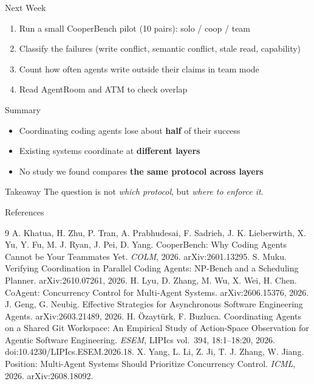 \documentclass[aspectratio=169,11pt]{beamer}
\begin{document}
\begin{frame}{Next Week}
  \begin{enumerate}
    \item Run a small CooperBench pilot (10 pairs): solo / coop / team
    \item Classify the failures (write conflict, semantic conflict, stale read, capability)
    \item Count how often agents write outside their claims in team mode
    \item Read AgentRoom and ATM to check overlap
  \end{enumerate}
\end{frame}

\begin{frame}{Summary}
  \begin{itemize}
    \item Coordinating coding agents lose about \textbf{half} of their success
    \item Existing systems coordinate at \textbf{different layers}
    \item No study we found compares \textbf{the same protocol across layers}
  \end{itemize}
  \vspace{1em}
  \begin{block}{Takeaway}
    The question is not \emph{which protocol}, but \emph{where to enforce it}.
  \end{block}
\end{frame}

\begin{frame}[allowframebreaks]{References}
  \footnotesize
  \begin{thebibliography}{9}
     A. Khatua, H. Zhu, P. Tran, A. Prabhudesai, F. Sadrieh, J. K. Lieberwirth, X. Yu, Y. Fu, M. J. Ryan, J. Pei, D. Yang. CooperBench: Why Coding Agents Cannot be Your Teammates Yet. \textit{COLM}, 2026. arXiv:2601.13295.
     S. Muku. Verifying Coordination in Parallel Coding Agents: NP-Bench and a Scheduling Planner. arXiv:2610.07261, 2026.
     H. Lyu, D. Zhang, M. Wu, X. Wei, H. Chen. CoAgent: Concurrency Control for Multi-Agent Systems. arXiv:2606.15376, 2026.
     J. Geng, G. Neubig. Effective Strategies for Asynchronous Software Engineering Agents. arXiv:2603.21489, 2026.
     H. \"Ozayt\"urk, F. Buzluca. Coordinating Agents on a Shared Git Workspace: An Empirical Study of Action-Space Observation for Agentic Software Engineering. \textit{ESEM}, LIPIcs vol.~394, 18:1--18:20, 2026. doi:10.4230/LIPIcs.ESEM.2026.18.
     X. Yang, L. Li, Z. Ji, T. J. Zhang, W. Jiang. Position: Multi-Agent Systems Should Prioritize Concurrency Control. \textit{ICML}, 2026. arXiv:2608.18092.
  \end{thebibliography}
\end{frame}
\end{document}
